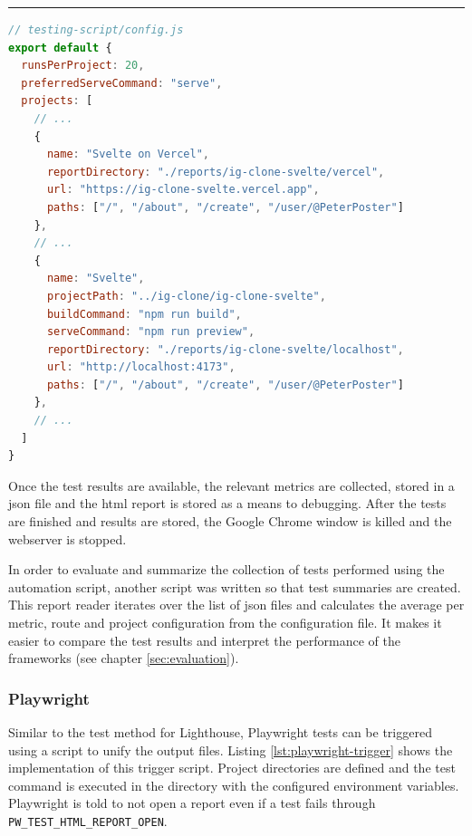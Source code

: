 \documentclass[a4paper, 12pt]{article}
\begin{document}
\hrule
\begin{lstlisting}[caption={Test configuration for Lighthouse tests}, language=JavaScript, label={lst:lighthouse-config}]
// testing-script/config.js
export default {
  runsPerProject: 20,
  preferredServeCommand: "serve",
  projects: [
    // ...
    {
      name: "Svelte on Vercel",
      reportDirectory: "./reports/ig-clone-svelte/vercel",
      url: "https://ig-clone-svelte.vercel.app",
      paths: ["/", "/about", "/create", "/user/@PeterPoster"]
    },
    // ...
    {
      name: "Svelte",
      projectPath: "../ig-clone/ig-clone-svelte",
      buildCommand: "npm run build",
      serveCommand: "npm run preview",
      reportDirectory: "./reports/ig-clone-svelte/localhost",
      url: "http://localhost:4173",
      paths: ["/", "/about", "/create", "/user/@PeterPoster"]
    },
    // ...
  ]
}
\end{lstlisting}
\vspace{1cm}

Once the test results are available, the relevant metrics are collected, stored in a \acrshort{json} file and the \acrshort{html} report is stored as a means to debugging.
After the tests are finished and results are stored, the Google Chrome window is killed and the webserver is stopped.

In order to evaluate and summarize the collection of tests performed using the automation script, another script was written so that test summaries are created.
This report reader iterates over the list of \acrshort{json} files and calculates the average per metric, route and project configuration from the configuration file.
It makes it easier to compare the test results and interpret the performance of the frameworks (see chapter \ref{sec:evaluation}).

\subsubsection{Playwright}

Similar to the test method for Lighthouse, Playwright tests can be triggered using a script to unify the output files.
Listing \ref{lst:playwright-trigger} shows the implementation of this trigger script.
Project directories are defined and the test command is executed in the directory with the configured environment variables.
Playwright is told to not open a report even if a test fails through \verb|PW_TEST_HTML_REPORT_OPEN|.
\end{document}
